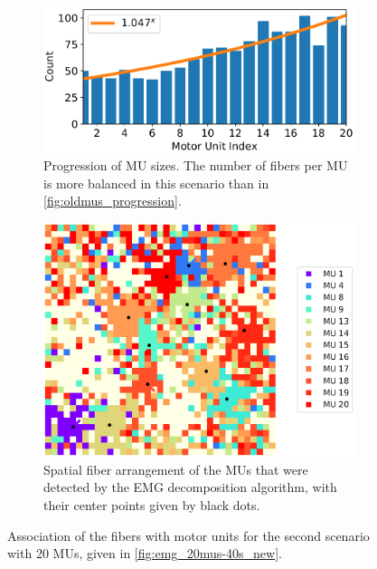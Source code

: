\begin{figure}
  \centering%
  \begin{subfigure}[t]{0.45\textwidth}%
    \centering%
    \includegraphics[width=\textwidth]{images/results/application/newmus1.pdf}%
    \caption{Progression of MU sizes. The number of fibers per MU is more balanced in this scenario than in \cref{fig:oldmus_progression}.}%
    \label{fig:newmus_progression}%
  \end{subfigure}\hfill
  \begin{subfigure}[t]{0.45\textwidth}%
    \centering%
    \includegraphics[width=\textwidth]{images/results/application/newmus3.pdf}%
    \caption{Spatial fiber arrangement of the MUs that were detected by the EMG decomposition algorithm, with their center points given by black dots.}%
    \label{fig:newmus_2d}%
  \end{subfigure} 
  \caption{Association of the fibers with motor units for the second scenario with 20 MUs, given in \cref{fig:emg_20mus-40s_new}.}%
  \label{fig:newmus}%
\end{figure}

